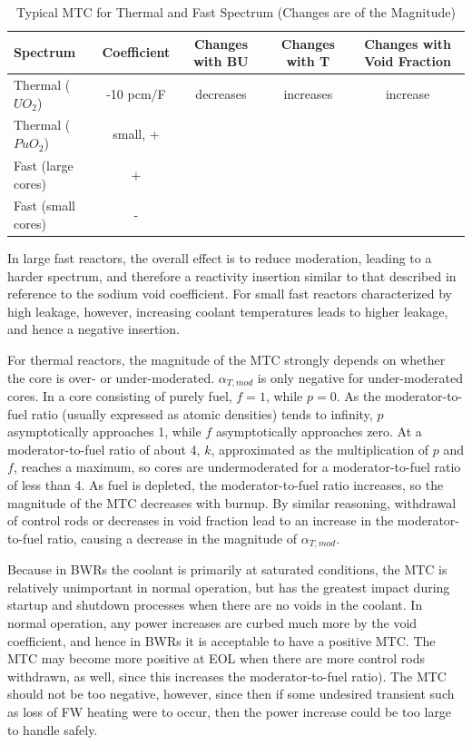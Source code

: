 \documentclass[10pt]{article}
\begin{document}
\begin{flushleft}
\begin{table}[h]
\caption{Typical MTC for Thermal and Fast Spectrum (Changes are of the Magnitude)}
\centering
\begin{tabular}{l c c c c}
\hline\hline
 Spectrum & Coefficient & Changes with BU & Changes with T & Changes with Void Fraction
\\ [0.5ex]
\hline
Thermal (\(UO_2\)) & -10 pcm/F & decreases & increases & increase\\
Thermal (\(PuO_2\)) & small, + &  &  & \\
Fast (large cores) & + &  & & \\
Fast (small cores) & - &  &  & \\
\hline
\end{tabular}
\label{tab:PPer}
\end{table}

In large fast reactors, the overall effect is to reduce moderation, leading to a harder spectrum, and therefore a reactivity insertion similar to that described in reference to the sodium void coefficient. For small fast reactors characterized by high leakage, however, increasing coolant temperatures leads to higher leakage, and hence a negative insertion.

For thermal reactors, the magnitude of the MTC strongly depends on whether the core is over- or under-moderated. \(\alpha_{T, mod}\) is only negative for under-moderated cores. In a core consisting of purely fuel, \(f=1\), while \(p=0\). As the moderator-to-fuel ratio (usually expressed as atomic densities) tends to infinity, \(p\) asymptotically approaches 1, while \(f\) asymptotically approaches zero. At a moderator-to-fuel ratio of about 4, \(k\), approximated as the multiplication of \(p\) and \(f\), reaches a maximum, so cores are undermoderated for a moderator-to-fuel ratio of less than 4. As fuel is depleted, the moderator-to-fuel ratio increases, so the magnitude of the MTC decreases with burnup. By similar reasoning, withdrawal of control rods or decreases in void fraction lead to an increase in the moderator-to-fuel ratio, causing a decrease in the magnitude of \(\alpha_{T,mod}\). 

Because in BWRs the coolant is primarily at saturated conditions, the MTC is relatively unimportant in normal operation, but has the greatest impact during startup and shutdown processes when there are no voids in the coolant. In normal operation, any power increases are curbed much more by the void coefficient, and hence in BWRs it is acceptable to have a positive MTC. The MTC may become more positive at EOL when there are more control rods withdrawn, as well, since this increases the moderator-to-fuel ratio). The MTC should not be too negative, however, since then if some undesired transient such as loss of FW heating were to occur, then the power increase could be too large to handle safely.


\end{flushleft}
\end{document}

